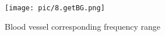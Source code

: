 \begin{figure}[htbp]
  \centering
  \texttt{[image: pic/8.getBG.png]}
  \caption{Blood vessel corresponding frequency range}
  \label{fig:getBG}
\end{figure}





